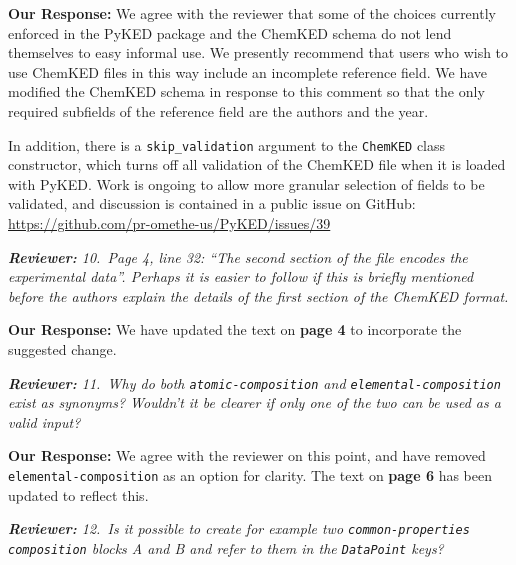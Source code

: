 \documentclass[a4paper,10pt]{elsarticle}
\newenvironment{reviewer}{\vspace{0.5\baselineskip}\begingroup\itshape\textbf{Reviewer:}}{\endgroup}
\newenvironment{response}{\textbf{Our Response:}}{\vspace{0.5\baselineskip}}
\begin{document}
\begin{response}
    We agree with the reviewer that some of the choices currently enforced in the PyKED package and
    the ChemKED schema do not lend themselves to easy informal use. We presently recommend that
    users who wish to use ChemKED files in this way include an incomplete reference field. We have
    modified the ChemKED schema in response to this comment so that the only required subfields of
    the reference field are the authors and the year.

    In addition, there is a \verb|skip_validation| argument to the \verb|ChemKED| class constructor,
    which turns off all validation of the ChemKED file when it is loaded with PyKED. Work is ongoing
    to allow more granular selection of fields to be validated, and discussion is contained in a
    public issue on GitHub: \url{https://github.com/pr-omethe-us/PyKED/issues/39}
\end{response}

\begin{reviewer}
    10.~Page 4, line 32: ``The second section of the file encodes the experimental data''. Perhaps
    it is easier to follow if this is briefly mentioned before the authors explain the details of
    the first section of the ChemKED format.
\end{reviewer}

\begin{response}
    We have updated the text on \textbf{page 4} to incorporate the suggested change.
\end{response}

\begin{reviewer}
    11.~Why do both \texttt{atomic-composition} and \texttt{elemental-composition} exist as
    synonyms? Wouldn't it be clearer if only one of the two can be used as a valid input?
\end{reviewer}

\begin{response}
    We agree with the reviewer on this point, and have removed \texttt{elemental-composition}
    as an option for clarity. The text on \textbf{page 6} has been updated to reflect this.
\end{response}

\begin{reviewer}
    12.~Is it possible to create for example two \texttt{common-properties} \texttt{composition}
    blocks A and B and refer to them in the \texttt{DataPoint} keys?
\end{reviewer}
\end{document}
